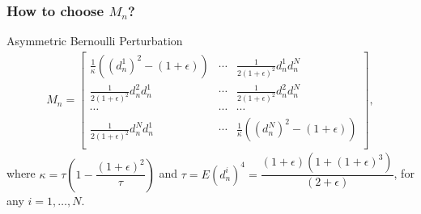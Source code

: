 \begin{frame}
\begin{small}
\frametitle{\centering  How to choose $M_n$?}
\begin{block}{Asymmetric Bernoulli Perturbation}
\begin{align}
\label{eq:2rdsa-estimate-ber}
 M_n =
\left[
\begin{array}{ccc}
\frac{1}{\kappa}\left((d_n^1)^2\!-(1+\epsilon)\right) & \cdots & \frac{1}{2(1+\epsilon)^2}d_n^1 d_n^N\\
\frac{1}{2(1+\epsilon)^2}d_n^2 d_n^1  &  \cdots & \frac{1}{2(1+\epsilon)^2}d_n^2 d_n^N\\
\cdots&\cdots&\cdots\\
\frac{1}{2(1+\epsilon)^2}d_n^N d_n^1 & \cdots &  \frac{1}{\kappa}\left((d_n^N)^2-(1+\epsilon)\right) \\
\end{array}
\right],
\end{align}
where $\kappa = \tau \left(1- \dfrac{(1+\epsilon)^2}{\tau}\right)$ and $\tau = E (d_n^i)^4= \dfrac{(1+\epsilon)(1+(1+\epsilon)^3)}{(2+\epsilon)}$, for any $i=1,\ldots,N$. 
\end{block}

\end{small}
\end{frame}





